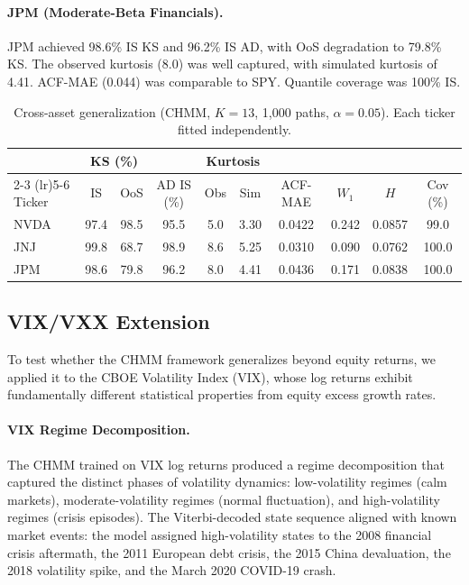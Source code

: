 \paragraph{JPM (Moderate-Beta Financials).}
JPM achieved 98.6\% IS KS and 96.2\% IS AD, with OoS degradation to 79.8\% KS.
The observed kurtosis (8.0) was well captured, with simulated kurtosis of 4.41.
ACF-MAE (0.044) was comparable to SPY.
Quantile coverage was 100\% IS.

\begin{table}[t]
\centering
\caption{Cross-asset generalization (CHMM, $K = 13$, 1,000 paths, $\alpha = 0.05$). Each ticker fitted independently.}
\label{tab:cross_asset}
\small
\begin{tabular}{l cc c cc c c c c}
\toprule
& \multicolumn{2}{c}{KS (\%)} & & \multicolumn{2}{c}{Kurtosis} & & & & \\
\cmidrule(lr){2-3} \cmidrule(lr){5-6}
Ticker & IS & OoS & AD IS (\%) & Obs & Sim & ACF-MAE & $W_1$ & $H$ & Cov (\%) \\
\midrule
NVDA & 97.4 & 98.5 & 95.5 & 5.0 & 3.30 & 0.0422 & 0.242 & 0.0857 & 99.0 \\
JNJ  & 99.8 & 68.7 & 98.9 & 8.6 & 5.25 & 0.0310 & 0.090 & 0.0762 & 100.0 \\
JPM  & 98.6 & 79.8 & 96.2 & 8.0 & 4.41 & 0.0436 & 0.171 & 0.0838 & 100.0 \\
\bottomrule
\end{tabular}
\end{table}

\subsection{VIX/VXX Extension}
\label{sec:vix_results}

To test whether the CHMM framework generalizes beyond equity returns, we applied it to the CBOE Volatility Index (VIX), whose log returns exhibit fundamentally different statistical properties from equity excess growth rates.

\paragraph{VIX Regime Decomposition.}
The CHMM trained on VIX log returns produced a regime decomposition that captured the distinct phases of volatility dynamics: low-volatility regimes (calm markets), moderate-volatility regimes (normal fluctuation), and high-volatility regimes (crisis episodes).
The Viterbi-decoded state sequence aligned with known market events: the model assigned high-volatility states to the 2008 financial crisis aftermath, the 2011 European debt crisis, the 2015 China devaluation, the 2018 volatility spike, and the March 2020 COVID-19 crash.

